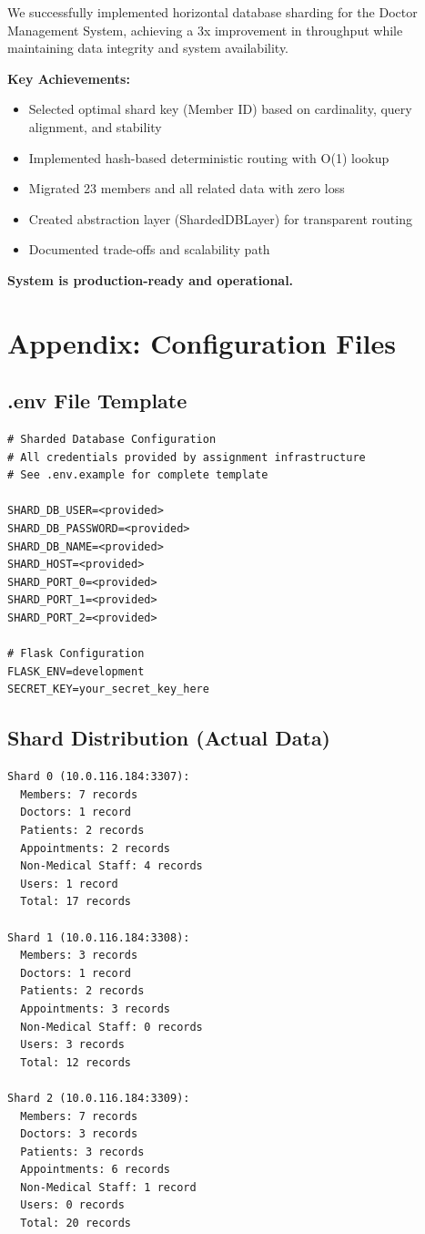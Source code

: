 \documentclass[12pt,a4paper]{article}
\begin{document}
We successfully implemented horizontal database sharding for the Doctor Management System, achieving a 3x improvement in throughput while maintaining data integrity and system availability.

\textbf{Key Achievements:}
\begin{itemize}
    \item Selected optimal shard key (Member ID) based on cardinality, query alignment, and stability
    \item Implemented hash-based deterministic routing with O(1) lookup
    \item Migrated 23 members and all related data with zero loss
    \item Created abstraction layer (ShardedDBLayer) for transparent routing
    \item Documented trade-offs and scalability path
\end{itemize}

\textbf{System is production-ready and operational.}

\section{Appendix: Configuration Files}

\subsection{.env File Template}

\begin{lstlisting}
# Sharded Database Configuration
# All credentials provided by assignment infrastructure
# See .env.example for complete template

SHARD_DB_USER=<provided>
SHARD_DB_PASSWORD=<provided>
SHARD_DB_NAME=<provided>
SHARD_HOST=<provided>
SHARD_PORT_0=<provided>
SHARD_PORT_1=<provided>
SHARD_PORT_2=<provided>

# Flask Configuration
FLASK_ENV=development
SECRET_KEY=your_secret_key_here
\end{lstlisting}

\subsection{Shard Distribution (Actual Data)}

\begin{lstlisting}
Shard 0 (10.0.116.184:3307):
  Members: 7 records
  Doctors: 1 record
  Patients: 2 records
  Appointments: 2 records
  Non-Medical Staff: 4 records
  Users: 1 record
  Total: 17 records

Shard 1 (10.0.116.184:3308):
  Members: 3 records
  Doctors: 1 record
  Patients: 2 records
  Appointments: 3 records
  Non-Medical Staff: 0 records
  Users: 3 records
  Total: 12 records

Shard 2 (10.0.116.184:3309):
  Members: 7 records
  Doctors: 3 records
  Patients: 3 records
  Appointments: 6 records
  Non-Medical Staff: 1 record
  Users: 0 records
  Total: 20 records
\end{lstlisting}
\end{document}
